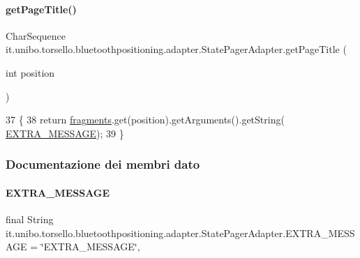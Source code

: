 \paragraph{\texorpdfstring{get\+Page\+Title()}{getPageTitle()}}
{\footnotesize\ttfamily Char\+Sequence it.\+unibo.\+torsello.\+bluetoothpositioning.\+adapter.\+State\+Pager\+Adapter.\+get\+Page\+Title (\begin{DoxyParamCaption}\item[{int}]{position }\end{DoxyParamCaption})}


\begin{DoxyCode}
37                                                    \{
38         \textcolor{keywordflow}{return} \hyperlink{classit_1_1unibo_1_1torsello_1_1bluetoothpositioning_1_1adapter_1_1StatePagerAdapter_a6d30ff8266b65b268d46d03eb30da1db_a6d30ff8266b65b268d46d03eb30da1db}{fragments}.get(position).getArguments().getString(
      \hyperlink{classit_1_1unibo_1_1torsello_1_1bluetoothpositioning_1_1adapter_1_1StatePagerAdapter_ac9b774a91ff682b603f6f2ef409c4bf2_ac9b774a91ff682b603f6f2ef409c4bf2}{EXTRA\_MESSAGE});
39     \}
\end{DoxyCode}


\subsubsection{Documentazione dei membri dato}
\hypertarget{classit_1_1unibo_1_1torsello_1_1bluetoothpositioning_1_1adapter_1_1StatePagerAdapter_ac9b774a91ff682b603f6f2ef409c4bf2_ac9b774a91ff682b603f6f2ef409c4bf2}{}\label{classit_1_1unibo_1_1torsello_1_1bluetoothpositioning_1_1adapter_1_1StatePagerAdapter_ac9b774a91ff682b603f6f2ef409c4bf2_ac9b774a91ff682b603f6f2ef409c4bf2} 
\paragraph{\texorpdfstring{E\+X\+T\+R\+A\+\_\+\+M\+E\+S\+S\+A\+GE}{EXTRA\_MESSAGE}}
{\footnotesize\ttfamily final String it.\+unibo.\+torsello.\+bluetoothpositioning.\+adapter.\+State\+Pager\+Adapter.\+E\+X\+T\+R\+A\+\_\+\+M\+E\+S\+S\+A\+GE = \char`\"{}E\+X\+T\+R\+A\+\_\+\+M\+E\+S\+S\+A\+GE\char`\"{}\hspace{0.3cm}{\ttfamily [static]}, {\ttfamily [private]}}

